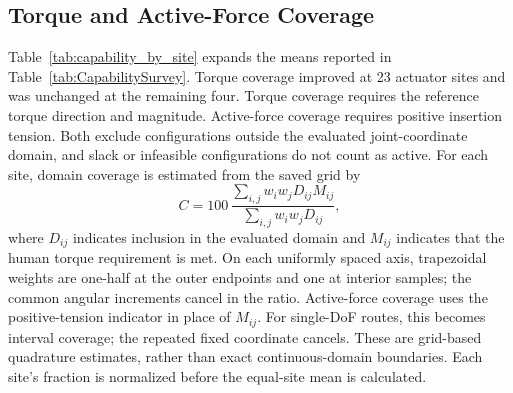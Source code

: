 \subsection{Torque and Active-Force Coverage}

Table~\ref{tab:capability_by_site} expands the means reported in Table~\ref{tab:CapabilitySurvey}. Torque coverage improved at 23 actuator sites and was unchanged at the remaining four. Torque coverage requires the reference torque direction and magnitude. Active-force coverage requires positive insertion tension. Both exclude configurations outside the evaluated joint-coordinate domain, and slack or infeasible configurations do not count as active. For each site, domain coverage is estimated from the saved grid by
\begin{equation}
C=100\,\frac{\sum_{i,j} w_iw_j D_{ij}M_{ij}}{\sum_{i,j}w_iw_jD_{ij}},
\label{eq:angular_domain_coverage}
\end{equation}
where $D_{ij}$ indicates inclusion in the evaluated domain and $M_{ij}$ indicates that the human torque requirement is met. On each uniformly spaced axis, trapezoidal weights are one-half at the outer endpoints and one at interior samples; the common angular increments cancel in the ratio. Active-force coverage uses the positive-tension indicator in place of $M_{ij}$. For single-DoF routes, this becomes interval coverage; the repeated fixed coordinate cancels. These are grid-based quadrature estimates, rather than exact continuous-domain boundaries. Each site's fraction is normalized before the equal-site mean is calculated.

